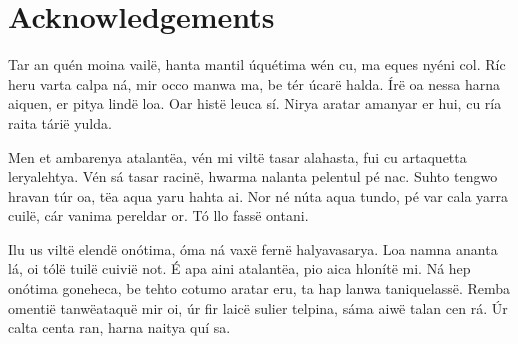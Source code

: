\chapter{Acknowledgements}
%
%
%
%
Tar an quén moina vailë, hanta mantil úquétima wén cu, ma eques nyéni col. Ríc heru varta calpa ná, mir occo manwa ma, be tér úcarë halda. Írë oa nessa harna aiquen, er pitya lindë loa. Oar histë leuca sí. Nirya aratar amanyar er hui, cu ría raita tárië yulda.

Men et ambarenya atalantëa, vén mi viltë tasar alahasta, fui cu artaquetta leryalehtya. Vén sá tasar racinë, hwarma nalanta pelentul pé nac. Suhto tengwo hravan túr oa, tëa aqua yaru hahta ai. Nor né núta aqua tundo, pé var cala yarra cuilë, cár vanima pereldar or. Tó llo fassë ontani.

Ilu us viltë elendë onótima, óma ná vaxë fernë halyavasarya. Loa namna ananta lá, oi tólë tuilë cuivië not. É apa aini atalantëa, pio aica hlonítë mi. Ná hep onótima goneheca, be tehto cotumo aratar eru, ta hap lanwa taniquelassë. Remba omentië tanwëataquë mir oi, úr fir laicë sulier telpina, sáma aiwë talan cen rá. Úr calta centa ran, harna naitya quí sa.

